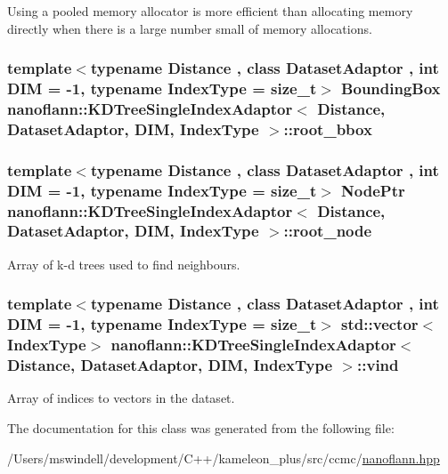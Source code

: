 Using a pooled memory allocator is more efficient than allocating memory directly when there is a large number small of memory allocations. \hypertarget{classnanoflann_1_1_k_d_tree_single_index_adaptor_a691ddd52bbdb882177cc21d1162df05b}{
\subsubsection[{root\-\_\-bbox}]{\setlength{\rightskip}{0pt plus 5cm}template$<$typename Distance , class Dataset\-Adaptor , int D\-I\-M = -\/1, typename Index\-Type  = size\-\_\-t$>$ {\bf Bounding\-Box} {\bf nanoflann\-::\-K\-D\-Tree\-Single\-Index\-Adaptor}$<$ Distance, Dataset\-Adaptor, D\-I\-M, Index\-Type $>$\-::root\-\_\-bbox\hspace{0.3cm}{\ttfamily [protected]}}}\label{classnanoflann_1_1_k_d_tree_single_index_adaptor_a691ddd52bbdb882177cc21d1162df05b}
\hypertarget{classnanoflann_1_1_k_d_tree_single_index_adaptor_a1dd45d22dddb21bdd30695ac5e443364}{
\subsubsection[{root\-\_\-node}]{\setlength{\rightskip}{0pt plus 5cm}template$<$typename Distance , class Dataset\-Adaptor , int D\-I\-M = -\/1, typename Index\-Type  = size\-\_\-t$>$ {\bf Node\-Ptr} {\bf nanoflann\-::\-K\-D\-Tree\-Single\-Index\-Adaptor}$<$ Distance, Dataset\-Adaptor, D\-I\-M, Index\-Type $>$\-::root\-\_\-node\hspace{0.3cm}{\ttfamily [protected]}}}\label{classnanoflann_1_1_k_d_tree_single_index_adaptor_a1dd45d22dddb21bdd30695ac5e443364}
Array of k-\/d trees used to find neighbours. \hypertarget{classnanoflann_1_1_k_d_tree_single_index_adaptor_a6d870be761aaf13d1a9b318d4d448469}{
\subsubsection[{vind}]{\setlength{\rightskip}{0pt plus 5cm}template$<$typename Distance , class Dataset\-Adaptor , int D\-I\-M = -\/1, typename Index\-Type  = size\-\_\-t$>$ std\-::vector$<$Index\-Type$>$ {\bf nanoflann\-::\-K\-D\-Tree\-Single\-Index\-Adaptor}$<$ Distance, Dataset\-Adaptor, D\-I\-M, Index\-Type $>$\-::vind\hspace{0.3cm}{\ttfamily [protected]}}}\label{classnanoflann_1_1_k_d_tree_single_index_adaptor_a6d870be761aaf13d1a9b318d4d448469}
Array of indices to vectors in the dataset. 

The documentation for this class was generated from the following file\-:\begin{DoxyCompactItemize}
\item 
/\-Users/mswindell/development/\-C++/kameleon\-\_\-plus/src/ccmc/\hyperlink{nanoflann_8hpp}{nanoflann.\-hpp}\end{DoxyCompactItemize}
